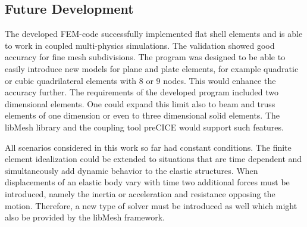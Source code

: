  \subsection{Future Development}
  The developed FEM-code successfully implemented flat shell elements and is able to work in coupled multi-physics simulations. The validation showed good accuracy for fine mesh subdivisions. The program was designed to be able to easily introduce new models for plane and plate elements, for example quadratic or cubic quadrilateral elements with 8 or 9 nodes. This would enhance the accuracy further. The requirements of the developed program included two dimensional elements. One could expand this limit also to beam and truss elements of one dimension or even to three dimensional solid elements. The libMesh library and the coupling tool preCICE would support such features.
  
  All scenarios considered in this work so far had constant conditions. The finite element idealization could be extended to situations that are time dependent and simultaneously add dynamic behavior to the elastic structures. When displacements of an elastic body vary with time two additional forces must be introduced, namely the inertia or acceleration and resistance opposing the motion. Therefore, a new type of solver must be introduced as well which might also be provided by the libMesh framework.
\newpage
